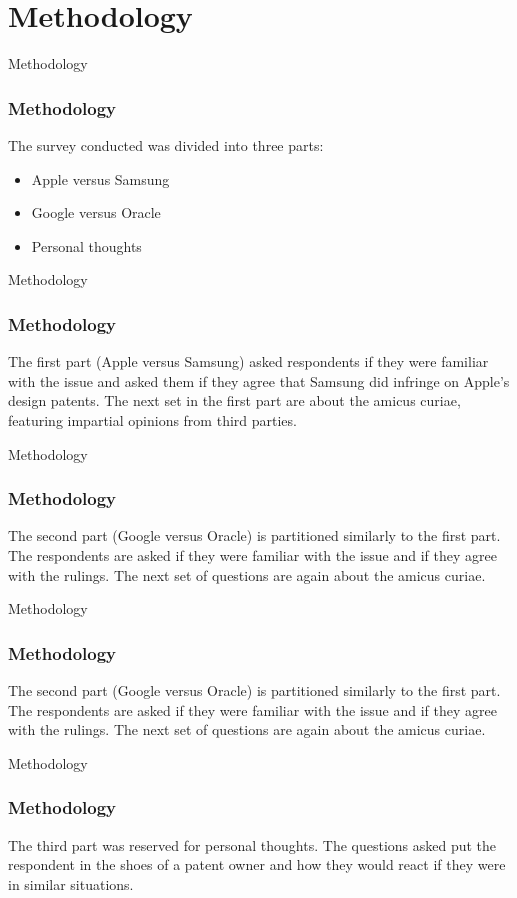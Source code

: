 \documentclass{beamer}
\begin{document}
\section{Methodology}
\begin{frame}{Methodology}
\frametitle{Methodology}
	The survey conducted was divided into three parts: 
	\begin{itemize}
		\item Apple versus Samsung
		\item Google versus Oracle
		\item Personal thoughts
	\end{itemize}
\end{frame}
\begin{frame}{Methodology}
\frametitle{Methodology}
	The first part (Apple versus Samsung) asked respondents if they were familiar with the issue \pause
	and asked them if they agree that Samsung did infringe on Apple's design patents. \pause
	The next set in the first part are about the amicus curiae, featuring impartial opinions from third parties.
\end{frame}
\begin{frame}{Methodology}
\frametitle{Methodology}
	The second part (Google versus Oracle) is partitioned similarly to the first part. \pause
	The respondents are asked if they were familiar with the issue\pause
	and if they agree with the rulings. \pause
	The next set of questions are again about the amicus curiae.
\end{frame}
\begin{frame}{Methodology}
\frametitle{Methodology}
	The second part (Google versus Oracle) is partitioned similarly to the first part. \pause
	The respondents are asked if they were familiar with the issue \pause
	and if they agree with the rulings. \pause
	The next set of questions are again about the amicus curiae.
\end{frame}
\begin{frame}{Methodology}
\frametitle{Methodology}
	The third part was reserved for personal thoughts. \pause
	The questions asked put the respondent in the shoes of a patent owner \pause
	and how they would react if they were in similar situations.
\end{frame}

\end{document}
